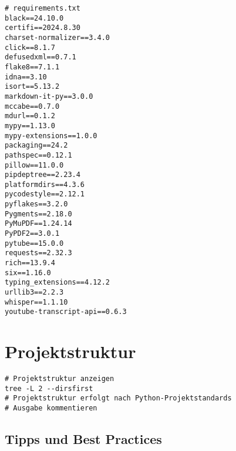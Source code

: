 \documentclass{vorlage-design-main}
\begin{document}
\begin{lstlisting}
# requirements.txt
black==24.10.0
certifi==2024.8.30
charset-normalizer==3.4.0
click==8.1.7
defusedxml==0.7.1
flake8==7.1.1
idna==3.10
isort==5.13.2
markdown-it-py==3.0.0
mccabe==0.7.0
mdurl==0.1.2
mypy==1.13.0
mypy-extensions==1.0.0
packaging==24.2
pathspec==0.12.1
pillow==11.0.0
pipdeptree==2.23.4
platformdirs==4.3.6
pycodestyle==2.12.1
pyflakes==3.2.0
Pygments==2.18.0
PyMuPDF==1.24.14
PyPDF2==3.0.1
pytube==15.0.0
requests==2.32.3
rich==13.9.4
six==1.16.0
typing_extensions==4.12.2
urllib3==2.2.3
whisper==1.1.10
youtube-transcript-api==0.6.3
\end{lstlisting}

\section{Projektstruktur}\label{projektstruktur}

\begin{lstlisting}
# Projektstruktur anzeigen
tree -L 2 --dirsfirst
# Projektstruktur erfolgt nach Python-Projektstandards
# Ausgabe kommentieren
\end{lstlisting}

\subsection{Tipps und Best Practices}\label{tipps-und-best-practices}
\end{document}
